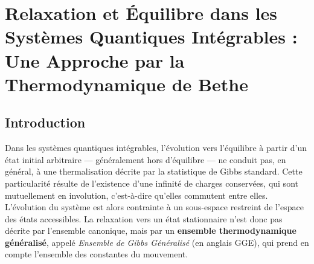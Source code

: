 \chapter{Relaxation et Équilibre dans les Systèmes Quantiques Intégrables : Une Approche par la Thermodynamique de Bethe}\label{chap:relaxation}
\minitoc

\section*{Introduction}



Dans les systèmes quantiques intégrables, l’évolution vers l’équilibre à partir d’un état initial arbitraire — généralement hors d’équilibre — ne conduit pas, en général, à une thermalisation décrite par la statistique de Gibbs standard. 
Cette particularité résulte de l’existence d’une infinité de charges conservées, qui sont mutuellement en involution, c’est-à-dire qu’elles commutent entre elles. 
L’évolution du système est alors contrainte à un sous-espace restreint de l’espace des états accessibles. 
La relaxation vers un état stationnaire n’est donc pas décrite par l’ensemble canonique, mais par un \textbf{ensemble thermodynamique généralisé}, appelé \emph{Ensemble de Gibbs Généralisé} (en anglais \gls{GGE}), qui prend en compte l’ensemble des constantes du mouvement.


